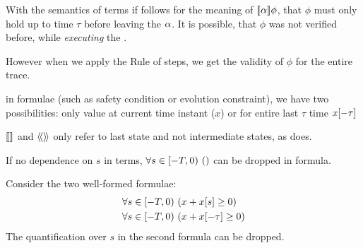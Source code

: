     With the semantics of terms if follows for the meaning of $\dbox{\asprg}{\phi}$, that $\phi$ must only hold up to time $\tau$ before leaving the \HP $\alpha$. It is possible, that $\phi$ was not verified before, while \emph{executing} the \HP.

    However when we apply the Rule of steps, we get the validity of $\phi$ for the entire trace.

    in formulae (such as safety condition or evolution constraint), we have two possibilities: only value at current time instant ($x$) or for entire last $\tau$ time $x[-\tau]$

    $\dbox{}{}$ and $\ddiamond{}{}$ only refer to last state and not intermediate states, as \dTL does.


    

    If no dependence on $s$ in terms, $\forall s\in[-T,0){\,} \left(\right)$ can be dropped in formula.

    \begin{example}
        Consider the two well-formed \ddL formulae:
        \begin{align*}
            &\forall s\in[-T,0){\,} \left(x+x[s]\geq 0\right)\\
            &\forall s\in[-T,0){\,} \left(x+x[-\tau]\geq 0\right) 
        \end{align*}
        The quantification over $s$ in the second formula can be dropped.
    \end{example}

